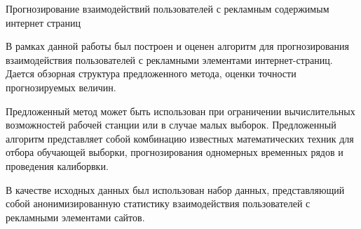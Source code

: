\thispagestyle{empty}
\hspace{14pt}
\begin{center}
    \Large Прогнозирование взаимодействий пользователей с рекламным содержимым интернет страниц \\
\end{center}
\hspace{14pt}

В рамках данной работы был построен и оценен алгоритм для прогнозирования взаимодействия 
пользователей с рекламными элементами интернет-страниц. Дается обзорная структура 
предложенного метода, оценки точности прогнозируемых величин.

Предложенный метод может быть использован при ограничении вычислительных возможностей рабочей станции
или в случае малых выборок. Предложенный алгоритм представляет собой комбинацию известных математических техник
для отбора обучающей выборки, прогнозирования одномерных временных рядов и проведения калиборвки.

В качестве исходных данных был использован набор данных, представляющий собой анонимизированную статистику
взаимодействия пользователей с рекламными элементами сайтов.